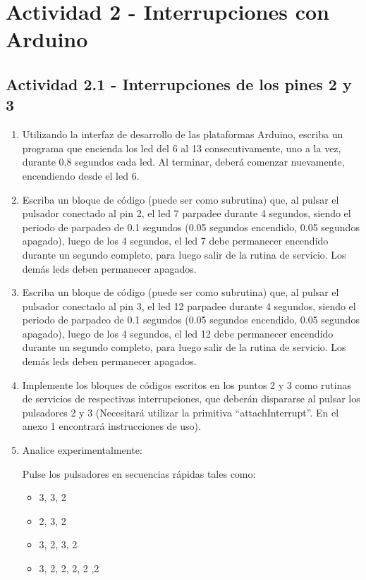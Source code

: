 \documentclass{article}
\begin{document}
\section*{Actividad 2 - Interrupciones con Arduino}
\subsection*{Actividad 2.1 - Interrupciones de los pines 2 y 3}

\begin{enumerate}[leftmargin=0pt]
\item Utilizando la interfaz de desarrollo de las plataformas Arduino, escriba un programa que encienda los led del 6 al 13 consecutivamente, uno a la vez, durante 0,8 segundos cada led. Al terminar, deberá comenzar nuevamente, encendiendo desde el led 6.

\item Escriba un bloque de código (puede ser como subrutina) que, al pulsar el pulsador conectado al pin 2, el led 7 parpadee durante 4 segundos, siendo el periodo de parpadeo de 0.1 segundos (0.05 segundos encendido, 0.05 segundos apagado), luego de los 4 segundos, el led 7 debe permanecer encendido durante un segundo completo, para luego salir de la rutina de servicio. Los demás leds deben permanecer apagados.

\item Escriba un bloque de código (puede ser como subrutina) que, al pulsar el pulsador conectado al pin 3, el led 12 parpadee durante 4 segundos, siendo el periodo de parpadeo de 0.1 segundos (0.05 segundos encendido, 0.05 segundos apagado), luego de los 4 segundos, el led 12 debe permanecer encendido durante un segundo completo, para luego salir de la rutina de servicio. Los demás leds deben permanecer apagados.

\item Implemente los bloques de códigos escritos en los puntos 2 y 3 como rutinas de servicios de respectivas interrupciones, que deberán dispararse al pulsar los pulsadores 2 y 3 (Necesitará utilizar la primitiva “attachInterrupt”. En el anexo 1 encontrará instrucciones de uso).

\item Analice experimentalmente:

Pulse los pulsadores en secuencias rápidas tales como:

\begin{itemize}
    \item 3, 3, 2
    \item 2, 3, 2
    \item 3, 2, 3, 2
    \item 3, 2, 2, 2, 2 ,2
\end{itemize}


\end{enumerate}
\end{document}
